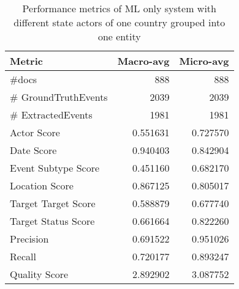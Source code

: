 \begin{table}
\centering
\begin{tabular}{lrr}
\toprule
              Metric &    Macro-avg &    Micro-avg \\
\midrule
               \#docs &   888 &   888 \\
 \# GroundTruthEvents &  2039 &  2039 \\
   \# ExtractedEvents &  1981 &  1981 \\
         Actor Score &     0.551631 &     0.727570 \\
          Date Score &     0.940403 &     0.842904 \\
 Event Subtype Score &     0.451160 &     0.682170 \\
      Location Score &     0.867125 &     0.805017 \\
 Target Target Score &     0.588879 &     0.677740 \\
 Target Status Score &     0.661664 &     0.822260 \\
           Precision &     0.691522 &     0.951026 \\
              Recall &     0.720177 &     0.893247 \\
       Quality Score &     2.892902 &     3.087752 \\
\bottomrule
\end{tabular}
\caption{Performance metrics of ML only system with different state actors of one country grouped into one entity}
\label{tab:mlgrouped}
\end{table}